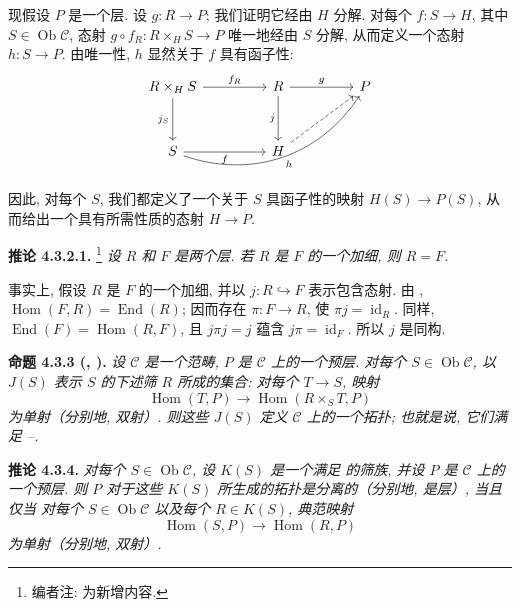 现假设 \(P\) 是一个层. 设 \(g:R\to P\); 我们证明它经由 \(H\) 分解.
对每个 \(f:S\to H\), 其中 \(S\in\operatorname{Ob}\mathscr C\),
态射 \(g\circ f_R:R\times_HS\to P\) 唯一地经由 \(S\) 分解,
从而定义一个态射 \(h:S\to P\).
由唯一性, \(h\) 显然关于 \(f\) 具有函子性:
\[
\begin{tikzcd}[column sep=4.5em,row sep=3.1em]
 R\times_HS
   \arrow[r,"f_R"]
   \arrow[d,"j_S"']
 &
 R
   \arrow[r,"g"]
   \arrow[d,"j"']
 &
 P
 \\
 S
   \arrow[r,"f"']
   \arrow[rru,bend right=38,"h"']
 &
 H
   \arrow[ru,dashed]
 &
 {}
\end{tikzcd}
\]
因此, 对每个 \(S\), 我们都定义了一个关于 \(S\) 具函子性的映射
\(H(S)\to P(S)\), 从而给出一个具有所需性质的态射 \(H\to P\).

\medskip
\noindent{}\textbf{推论 4.3.2.1.}
\footnote{编者注: 为新增内容.}
\textit{设 \(R\) 和 \(F\) 是两个层.
若 \(R\) 是 \(F\) 的一个加细, 则 \(R=F\).}

事实上, 假设 \(R\) 是 \(F\) 的一个加细,
并以 \(j:R\hookrightarrow F\) 表示包含态射.
由 ,
\(\operatorname{Hom}(F,R)=\operatorname{End}(R)\);
因而存在 \(\pi:F\to R\), 使 \(\pi j=\operatorname{id}_R\).
同样, \(\operatorname{End}(F)=\operatorname{Hom}(R,F)\),
且 \(j\pi j=j\) 蕴含 \(j\pi=\operatorname{id}_F\).
所以 \(j\) 是同构.

\medskip
\noindent{}\textbf{命题 4.3.3 (, ).}
\textit{设 \(\mathscr C\) 是一个范畴, \(P\) 是 \(\mathscr C\) 上的一个预层.
对每个 \(S\in\operatorname{Ob}\mathscr C\), 以 \(J(S)\) 表示
\(S\) 的下述筛 \(R\) 所成的集合: 对每个 \(T\to S\), 映射}
\[
\tag{+}\label{sga3:iv:proposition:4:3:3:eq:unnamed:01}
 \operatorname{Hom}(T,P)\longrightarrow
 \operatorname{Hom}(R\times_ST,P)
\]
\textit{为单射（分别地, 双射）.
则这些 \(J(S)\) 定义 \(\mathscr C\) 上的一个拓扑;
也就是说, 它们满足 --.}

\medskip
\noindent{}\textbf{推论 4.3.4.}
\textit{对每个 \(S\in\operatorname{Ob}\mathscr C\),
设 \(K(S)\) 是一个满足 
的筛族, 并设 \(P\) 是 \(\mathscr C\) 上的一个预层.
则 \(P\) 对于这些 \(K(S)\) 所生成的拓扑是分离的（分别地, 是层）, 当且仅当
对每个 \(S\in\operatorname{Ob}\mathscr C\) 以及每个 \(R\in K(S)\), 典范映射}
\[
\tag{+}\label{sga3:iv:corollary:4:3:4:eq:unnamed:01}
 \operatorname{Hom}(S,P)\longrightarrow\operatorname{Hom}(R,P)
\]
\textit{为单射（分别地, 双射）.}

